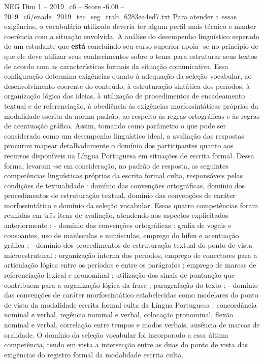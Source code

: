 \begin{textsample}{NEG Dim 1 – 2019\_c6 – Score -6.00 – 2019\_c6/enade\_2019\_tec\_seg\_trab\_6283ea4ed7.txt}
Para atender a essas exigências, o vocabulário utilizado deveria ter algum perfil mais técnico e manter coerência com a situação envolvida.
A análise do desempenho linguístico esperado de um estudante que \textbf{está} concluindo seu curso superior apoia -se no princípio de que ele deve utilizar seus conhecimentos sobre o tema para estruturar seus textos de acordo com as características formais da situação comunicativa.
Essa configuração determina exigências quanto à adequação da seleção vocabular, ao desenvolvimento coerente do conteúdo, à estruturação sintática dos períodos, à organização lógica das ideias, à utilização de procedimentos de encadeamento textual e de referenciação, à obediência às exigências morfossintáticas próprias da modalidade escrita da norma-padrão, ao respeito às regras ortográficas e às regras de acentuação gráfica.
Assim, tomando como parâmetro o que pode ser considerado como um desempenho linguístico ideal, a avaliação das respostas procurou mapear detalhadamente o domínio dos participantes quanto aos recursos disponíveis na Língua Portuguesa em situações de escrita formal.
Dessa forma, levaram -se em consideração, no padrão de resposta, as seguintes competências linguísticas próprias da escrita formal culta, responsáveis pelas condições de textualidade : domínio das convenções ortográficas, domínio dos procedimentos de estruturação textual, domínio das convenções de caráter morfossintático e domínio da seleção vocabular.
Essas quatro competências foram reunidas em três itens de avaliação, atendendo aos aspectos explicitados anteriormente : - domínio das convenções ortográficas : grafia de vogais e consoantes, uso de maiúsculas e minúsculas, emprego do hífen e acentuação gráfica ; - domínio dos procedimentos de estruturação textual do ponto de vista microestrutural : organização interna dos períodos, emprego de conectores para a articulação lógica entre os períodos e entre os parágrafos ; emprego de marcas de referenciação lexical e pronominal ; utilização dos sinais de pontuação que contribuem para a organização lógica da frase ; paragrafação do texto ; - domínio das convenções de caráter morfossintático estabelecidas como modelares do ponto de vista da modalidade escrita formal culta da Língua Portuguesa : concordância nominal e verbal, regência nominal e verbal, colocação pronominal, flexão nominal e verbal, correlação entre tempos e modos verbais, ausência de marcas de oralidade.
O domínio da seleção vocabular foi incorporado a essa última competência, tendo em vista a intersecção entre as duas do ponto de vista das exigências do registro formal da modalidade escrita culta.

\end{textsample}
